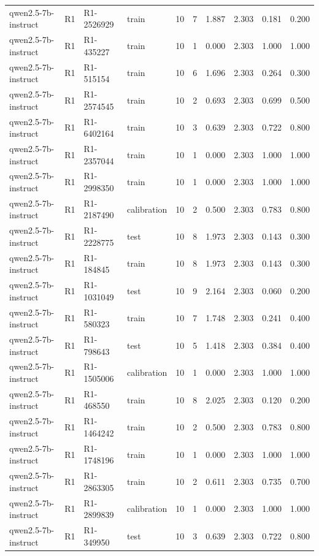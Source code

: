 \begin{table}
\begin{tabular}{llllrrrrrr}
qwen2.5-7b-instruct & R1 & R1-2526929 & train & 10 & 7 & 1.887 & 2.303 & 0.181 & 0.200 \\
qwen2.5-7b-instruct & R1 & R1-435227 & train & 10 & 1 & 0.000 & 2.303 & 1.000 & 1.000 \\
qwen2.5-7b-instruct & R1 & R1-515154 & train & 10 & 6 & 1.696 & 2.303 & 0.264 & 0.300 \\
qwen2.5-7b-instruct & R1 & R1-2574545 & train & 10 & 2 & 0.693 & 2.303 & 0.699 & 0.500 \\
qwen2.5-7b-instruct & R1 & R1-6402164 & train & 10 & 3 & 0.639 & 2.303 & 0.722 & 0.800 \\
qwen2.5-7b-instruct & R1 & R1-2357044 & train & 10 & 1 & 0.000 & 2.303 & 1.000 & 1.000 \\
qwen2.5-7b-instruct & R1 & R1-2998350 & train & 10 & 1 & 0.000 & 2.303 & 1.000 & 1.000 \\
qwen2.5-7b-instruct & R1 & R1-2187490 & calibration & 10 & 2 & 0.500 & 2.303 & 0.783 & 0.800 \\
qwen2.5-7b-instruct & R1 & R1-2228775 & test & 10 & 8 & 1.973 & 2.303 & 0.143 & 0.300 \\
qwen2.5-7b-instruct & R1 & R1-184845 & train & 10 & 8 & 1.973 & 2.303 & 0.143 & 0.300 \\
qwen2.5-7b-instruct & R1 & R1-1031049 & test & 10 & 9 & 2.164 & 2.303 & 0.060 & 0.200 \\
qwen2.5-7b-instruct & R1 & R1-580323 & train & 10 & 7 & 1.748 & 2.303 & 0.241 & 0.400 \\
qwen2.5-7b-instruct & R1 & R1-798643 & test & 10 & 5 & 1.418 & 2.303 & 0.384 & 0.400 \\
qwen2.5-7b-instruct & R1 & R1-1505006 & calibration & 10 & 1 & 0.000 & 2.303 & 1.000 & 1.000 \\
qwen2.5-7b-instruct & R1 & R1-468550 & train & 10 & 8 & 2.025 & 2.303 & 0.120 & 0.200 \\
qwen2.5-7b-instruct & R1 & R1-1464242 & train & 10 & 2 & 0.500 & 2.303 & 0.783 & 0.800 \\
qwen2.5-7b-instruct & R1 & R1-1748196 & train & 10 & 1 & 0.000 & 2.303 & 1.000 & 1.000 \\
qwen2.5-7b-instruct & R1 & R1-2863305 & train & 10 & 2 & 0.611 & 2.303 & 0.735 & 0.700 \\
qwen2.5-7b-instruct & R1 & R1-2899839 & calibration & 10 & 1 & 0.000 & 2.303 & 1.000 & 1.000 \\
qwen2.5-7b-instruct & R1 & R1-349950 & test & 10 & 3 & 0.639 & 2.303 & 0.722 & 0.800 \\

\end{tabular}
\end{table}
